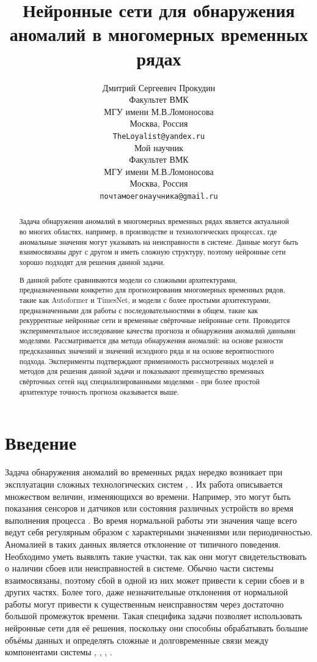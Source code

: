 \documentclass{article}
\title{Нейронные сети для обнаружения аномалий в многомерных временных рядах}
\author{  Дмитрий Сергеевич Прокудин \\
	Факультет ВМК \\
    МГУ имени М.В.Ломоносова \\
	Москва, Россия \\
	\texttt{TheLoyalist@yandex.ru} \\
	\And
	Мой научник \\
	Факультет ВМК \\
    МГУ имени М.В.Ломоносова \\
	Москва, Россия \\
	\texttt{почтамоегонаучника@gmail.ru}  \\
}
\date{}
\begin{document}
\maketitle

\begin{abstract}
Задача обнаружения аномалий в многомерных временных рядах является актуальной во многих областях, например, в производстве и технологических процессах, где аномальные значения могут указывать на неисправности в системе. Данные могут быть взаимосвязаны друг с другом и иметь сложную структуру, поэтому нейронные сети хорошо подходят для решения данной задачи.  
    
В данной работе сравниваются модели со сложными архитектурами, предназначенными конкретно для прогнозирования многомерных временных рядов, такие как Autoformer и TimesNet, и модели с более простыми архитектурами, предназначенными для работы с последовательностями в общем, такие как рекуррентные нейронные сети и временные свёрточные нейронные сети. Проводится экспериментальное исследование качества прогноза и обнаружения аномалий данными моделями. Рассматривается два метода обнаружения аномалий: на основе разности предсказанных значений и значений исходного ряда и на основе вероятностного подхода. Эксперименты подтверждают применимость рассмотренных моделей и методов для решения данной задачи и показывают преимущество временных свёрточных сетей над специализированными моделями - при более простой архитектуре точность прогноза оказывается выше. 
\end{abstract}



\section{Введение}
Задача обнаружения аномалий во временных рядах нередко возникает при эксплуатации сложных технологических систем \cite{darban2022deep}, \cite{shalyga2018anomaly}. Их работа описывается множеством величин, изменяющихся во времени. Например, это могут быть показания сенсоров и датчиков или состояния различных устройств во время выполнения процесса \cite{shalyga2018anomaly}. Во время нормальной работы эти значения чаще всего ведут себя регулярным образом с характерными значениями или периодичностью. Аномалией в таких данных является отклонение от типичного поведения. Необходимо уметь выявлять такие участки, так как они могут свидетельствовать о наличии сбоев или неисправностей в системе. Обычно части системы взаимосвязаны, поэтому сбой в одной из них может привести к серии сбоев и в других частях. Более того, даже незначительные отклонения от нормальной работы могут привести к существенным неисправностям через достаточно большой промежуток времени. Такая специфика задачи позволяет использовать нейронные сети для её решения, поскольку они способны обрабатывать большие объёмы данных и определять сложные и долговременные связи между компонентами системы \cite{darban2022deep}, \cite{shalyga2018anomaly}, \cite{kravchik2019efficient}, \cite{nie2023time}.
\end{document}
